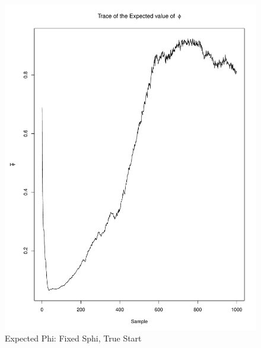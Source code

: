 \documentclass[11pt]{labbook}
\begin{document}
    \begin{figure}
        \centering
        \includegraphics[scale=.65]{FONSE_Plots/2016/November_8/fixedSphi_sim_expectedPhi}
        \caption{Expected Phi: Fixed Sphi, True Start}
        \label{fig:NOV8_F.S.EPHI}
    \end{figure}
\end{document}
